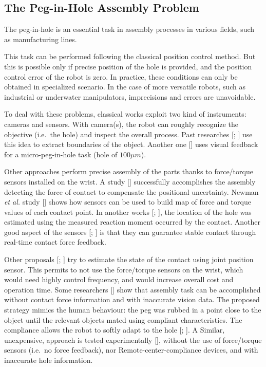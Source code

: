 \subsection{The Peg-in-Hole Assembly Problem}
The peg-in-hole is an essential task in assembly
processes in various fields, such as manufacturing lines.

This task can be performed following the classical position control method. But this is possible only if precise position of the hole is provided, and the position control error of the robot is zero.
In practice, these conditions can only be obtained in specialized scenario. In the case of more versatile robots, such as industrial or underwater manipulators, 
imprecisions and errors are unavoidable.

To deal with these problems, classical works exploit two kind of instruments: cameras and sensors. 
With camera(s), the robot can roughly recognize the objective (i.e.\ the hole) and inspect the overall process. Past researches [\cite{IntroPeg2}; \cite{IntroPeg1}] use this idea to extract boundaries of the object. Another one [\cite{IntroPeg3}] uses visual feedback for a micro-peg-in-hole task (hole of $100 \mu m$).

Other approaches perform precise assembly of the parts thanks to force/torque sensors installed on the wrist. A study [\cite{IntroPeg4}] successfully accomplishes the assembly detecting the force of contact to compensate the positional uncertainty. Newman \textit{et al.} study [\cite{IntroPeg7}] shows how sensors can be used to build map of force and torque values of each contact point.  
In another works [\cite{IntroPeg9}; \cite{IntroPeg8}], the location of the hole was estimated using the measured reaction moment occurred by the contact.
Another good aspect of the sensors [\cite{IntroPeg6}; \cite{IntroPeg5}] is that they can guarantee stable contact through real-time contact force feedback.

Other proposals [\cite{IntroPeg10}; \cite{IntroPeg11}] try to estimate the state of the contact using joint position sensor. This permits to not use the force/torque sensors on the wrist, which would need highly control frequency, and would increase overall cost and operation time. 
Some researchers [\cite{IntroPeg12}] show that assembly task can be accomplished without contact force information and with inaccurate vision data. The proposed strategy  mimics the human behaviour: the peg was rubbed in a point close to the object until the relevant objects mated using compliant characteristics. The compliance allows the robot to softly adapt to the hole [\cite{IntroPeg13}; \cite{IntroPeg14}].
A Similar, unexpensive, approach is tested experimentally [\cite{IntroPeg15}], without the use of force/torque sensors (i.e.\ no force feedback), nor Remote-center-compliance devices, and with inaccurate hole information.











